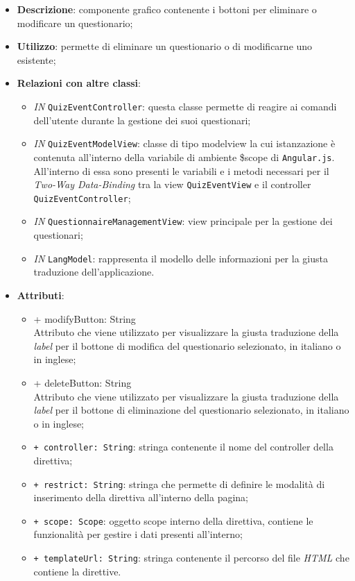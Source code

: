 \begin{itemize}
	\item \textbf{Descrizione}: componente grafico contenente i bottoni per eliminare o modificare un questionario;
	\item \textbf{Utilizzo}: permette di eliminare un questionario o di modificarne uno esistente;
	\item \textbf{Relazioni con altre classi}:
	\begin{itemize}
		\item \textit{IN} \texttt{QuizEventController}: questa classe permette di reagire ai comandi dell'utente durante la gestione dei suoi questionari;
		\item \textit{IN} \texttt{QuizEventModelView}: classe di tipo modelview la cui istanzazione è contenuta all'interno della variabile di ambiente \$scope di \texttt{Angular.js}. All'interno di essa sono presenti le variabili e i metodi necessari per il \textit{Two-Way Data-Binding} tra la view \texttt{QuizEventView} e il controller \texttt{QuizEventController};
		\item \textit{IN} \texttt{QuestionnaireManagementView}: view principale per la gestione dei questionari; 
		\item \textit{IN} \texttt{LangModel}: rappresenta il modello delle informazioni per la giusta traduzione dell'applicazione.
	\end{itemize}
	\item \textbf{Attributi}:
	\begin{itemize}
		\item {+ modifyButton: String} \\ Attributo che viene utilizzato per visualizzare la giusta traduzione della \textit{label} per il bottone di modifica del questionario selezionato, in italiano o in inglese; 
		\item {+ deleteButton: String} \\ Attributo che viene utilizzato per visualizzare la giusta traduzione della \textit{label} per il bottone di eliminazione del questionario selezionato, in italiano o in inglese;
		\item \texttt{+ controller: String}: stringa contenente il nome del controller della direttiva;
		\item \texttt{+ restrict: String}: stringa che permette di definire le modalità di inserimento della direttiva all'interno della pagina;
		\item \texttt{+ scope: Scope}: oggetto scope interno della direttiva, contiene le funzionalità per gestire i dati presenti all'interno;
		\item \texttt{+ templateUrl: String}: stringa contenente il percorso del file \textit{HTML} che contiene la direttive.
	\end{itemize}
\end{itemize}

